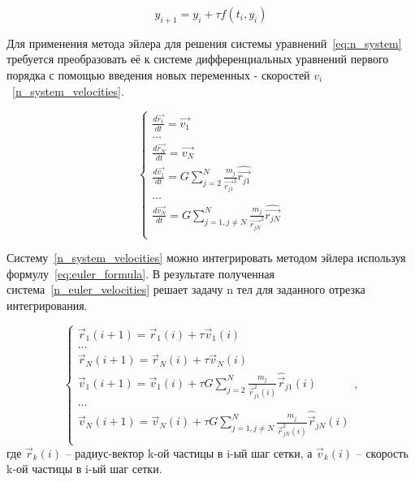 \begin{equation}
	\label{eq:euler_formula}
	y_{i+1} = y_i + \tau f(t_i, y_i)
\end{equation}

Для применения метода эйлера для решения системы уравнений~\ref{eq:n_system} требуется преобразовать её к системе дифференциальных уравнений первого порядка с помощью введения новых переменных - скоростей $v_i$~\ref{n_system_velocities}.

\begin{equation}
	\label{n_system_velocities}
	\begin{cases}
		\frac{d\vec{r_1}}{dt} = \vec{v_1} \\
		\dots \\
		\frac{d\vec{r_N}}{dt} = \vec{v_N} \\
		
		\frac{d\vec{v_1}}{dt} = G\sum_{j=2}^{N}{\frac{m_j}{\vec{r_{j1}}^2}\hat{\vec{r_{j1}}}} \\
		\dots \\
		\frac{d\vec{v_N}}{dt} = G\sum_{j=1, j \neq N}^{N}{\frac{m_j}{\vec{r_{jN}}^2}\hat{\vec{r_{jN}}}} \\
	\end{cases}
\end{equation}

Систему~\ref{n_system_velocities} можно интегрировать методом эйлера используя формулу~\ref{eq:euler_formula}. В результате полученная система~\ref{n_euler_velocities} решает задачу n тел для заданного отрезка интегрирования.

\begin{equation}
	\label{n_euler_velocities}
	\begin{cases}
		\vec{r}_{1}(i+1) = \vec{r}_{1}(i) + \tau \vec{v}_{1}(i) \\
		\dots \\
		\vec{r}_{N}(i+1) = \vec{r}_{N}(i) + \tau \vec{v}_{N}(i) \\
		
		
		\vec{v}_{1}(i+1) = \vec{v}_{1}(i) + \tau G\sum_{j=2}^{N}{\frac{m_j}{\vec{r}_{j1}^2(i)}\hat{\vec{r}}_{j1}(i)} \\
		\dots \\
		\vec{v}_{N}(i+1) = \vec{v}_{N}(i) + \tau G\sum_{j=1, j \neq N}^{N}{\frac{m_j}{\vec{r}_{jN}^2(i)}\hat{\vec{r}}_{jN}(i)} \\
	\end{cases},
\end{equation}
где $\vec{r}_k(i)$ -- радиус-вектор k-ой частицы в i-ый шаг сетки, а $\vec{v}_k(i)$ -- скорость k-ой частицы в i-ый шаг сетки.

